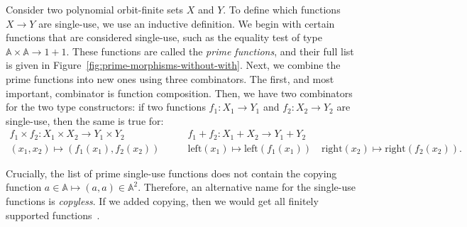 \documentclass[10pt,a4paper]{amsart}
\numberwithin{equation}{section}
\theoremstyle{plain}
\newcommand{\atoms}{\mathbb A}
\begin{document}
Consider two polynomial orbit-finite sets $X$ and $Y$. To define which functions $X \to Y$ are single-use, we use an inductive definition. We begin with certain functions that are considered single-use, such as the equality test of type $\atoms \times \atoms \to 1 + 1$. These functions are called the \emph{prime functions}, and their full list is given in Figure~\ref{fig:prime-morphisms-without-with}. Next, we combine the prime functions into new ones using three combinators. The first, and most important, combinator is  function composition. Then, we have two combinators for the two type constructors: if two functions $f_1 : X_1 \to Y_1$ and $f_2 : X_2 \to Y_2$ are single-use, then the same is true for:
\begin{align*}
    f_1 \times f_2 : X_1 \times X_2 \to Y_1 \times Y_2
    \qquad &
    f_1 + f_2 : X_1 + X_2 \to Y_1 + Y_2 \\
    \scriptstyle  (x_1,x_2) \mapsto (f_1(x_1),f_2(x_2)) 
    \qquad &
    {\scriptstyle \text{left}(x_1) \mapsto \text{left}(f_1(x_1)) 
        \quad 
        \text{right}(x_2) \mapsto \text{right}(f_2(x_2)) }.
\end{align*}

Crucially, the list of prime single-use functions does not contain the copying function $a \in \atoms \mapsto (a,a) \in \atoms^2$. Therefore, an alternative name for the single-use functions is \emph{copyless}. If we added copying, then we would get all finitely supported functions~\cite[Lemma 23]{stefanski-phd}.
\end{document}
